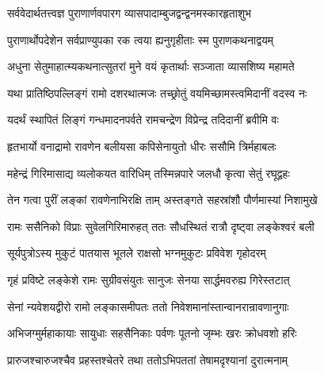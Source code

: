 
\vakta{}
\shrota{}
\tags{}
\notes{}

\storymeta





\twolineshloka
{सर्ववेदार्थतत्त्वज्ञ पुराणार्णवपारग}
{व्यासपादाम्बुजद्वन्द्वनमस्कारहृताशुभ}%

\twolineshloka
{पुराणार्थोपदेशेन सर्वप्राण्युपका रक}
{त्वया ह्यनुगृहीताः स्म पुराणकथनाद्वयम्}%

\twolineshloka
{अधुना सेतुमाहात्म्यकथनात्सुतरां मुने}
{वयं कृतार्थाः सञ्जाता व्यासशिष्य महामते}%

\twolineshloka
{यथा प्रातिष्ठिपल्लिङ्गं रामो दशरथात्मजः}
{तच्छ्रोतुं वयमिच्छामस्त्वमिदानीं वदस्व नः}%


\twolineshloka
{यदर्थं स्थापितं लिङ्गं गन्धमादनपर्वते}
{रामचन्द्रेण विप्रेन्द्र तदिदानीं ब्रवीमि वः}%

\twolineshloka
{हृतभार्यो वनाद्रामो रावणेन बलीयसा}
{कपिसेनायुतो धीरः ससौमि त्रिर्महाबलः}%

\twolineshloka
{महेन्द्रं गिरिमासाद्य व्यलोकयत वारिधिम्}
{तस्मिन्नपारे जलधौ कृत्वा सेतुं रघूद्वहः}%

\twolineshloka
{तेन गत्वा पुरीं लङ्कां रावणेनाभिरक्षि ताम्}
{अस्तङ्गते सहस्रांशौ पौर्णमास्यां निशामुखे}%

\twolineshloka
{रामः ससैनिको विप्राः सुवेलगिरिमारुहत्}
{ततः सौधस्थितं रात्रौ दृष्ट्वा लङ्केश्वरं बली}%

\twolineshloka
{सूर्यपुत्रोऽस्य मुकुटं पातयास भूतले}
{राक्षसो भग्नमुकुटः प्रविवेश गृहोदरम्}%

\twolineshloka
{गृहं प्रविष्टे लङ्केशे रामः सुग्रीवसंयुतः}
{सानुजः सेनया सार्द्धमवरुह्य गिरेस्तटात्}%

\twolineshloka
{सेनां न्यवेशयद्वीरो रामो लङ्कासमीपतः}
{ततो निवेशमानांस्तान्वानरान्रावणानुगाः}%

\twolineshloka
{अभिजग्मुर्महाकायाः सायुधाः सहसैनिकाः}
{पर्वणः पूतनो जृम्भः खरः क्रोधवशो हरिः}%

\twolineshloka
{प्रारुजश्चारुजश्चैव प्रहस्तश्चेतरे तथा}
{ततोऽभिपततां तेषामदृश्यानां दुरात्मनाम्}%

